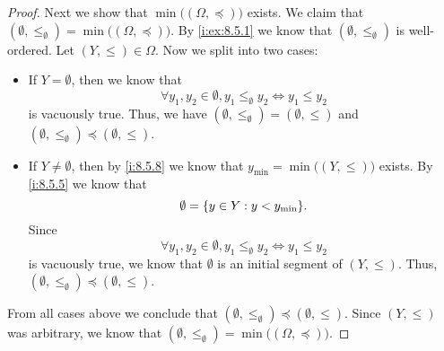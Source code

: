 \begin{proof}
  Next we show that \(\min\big((\Omega, \preceq)\big)\) exists.
  We claim that \((\emptyset, \leq_{\emptyset}) = \min\big((\Omega, \preceq)\big)\).
  By \cref{i:ex:8.5.1} we know that \((\emptyset, \leq_{\emptyset})\) is well-ordered.
  Let \((Y, \leq) \in \Omega\).
  Now we split into two cases:
  \begin{itemize}
    \item If \(Y = \emptyset\), then we know that
          \[
            \forall y_1, y_2 \in \emptyset, y_1 \leq_{\emptyset} y_2 \iff y_1 \leq y_2
          \]
          is vacuously true.
          Thus, we have \((\emptyset, \leq_{\emptyset}) = (\emptyset, \leq)\) and \((\emptyset, \leq_{\emptyset}) \preceq (\emptyset, \leq)\).
    \item If \(Y \neq \emptyset\), then by \cref{i:8.5.8} we know that \(y_{\min} = \min\big((Y, \leq)\big)\) exists.
          By \cref{i:8.5.5} we know that
          \[
            \emptyset = \set{y \in Y : y < y_{\min}}.
          \]
          Since
          \[
            \forall y_1, y_2 \in \emptyset, y_1 \leq_{\emptyset} y_2 \iff y_1 \leq y_2
          \]
          is vacuously true, we know that \(\emptyset\) is an initial segment of \((Y, \leq)\).
          Thus, \((\emptyset, \leq_{\emptyset}) \preceq (\emptyset, \leq)\).
  \end{itemize}
  From all cases above we conclude that \((\emptyset, \leq_{\emptyset}) \preceq (\emptyset, \leq)\).
  Since \((Y, \leq)\) was arbitrary, we know that \((\emptyset, \leq_{\emptyset}) = \min\big((\Omega, \preceq)\big)\).


\end{proof}
